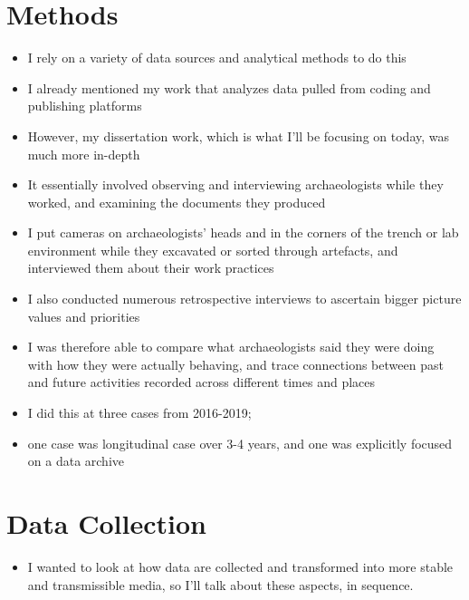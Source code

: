 \documentclass{article}
\begin{document}
\section{Methods}
\begin{itemize}
  \item I rely on a variety of data sources and analytical methods to do this
  \item I already mentioned my work that analyzes data pulled from coding and publishing platforms
  \item However, my dissertation work, which is what I'll be focusing on today, was much more in-depth
  \item It essentially involved observing and interviewing archaeologists while they worked, and examining the documents they produced
  \item I put cameras on archaeologists’ heads and in the corners of the trench or lab environment while they excavated or sorted through artefacts, and interviewed them about their work practices
  \item I also conducted numerous retrospective interviews to ascertain bigger picture values and priorities
  \item I was therefore able to compare what archaeologists said they were doing with how they were actually behaving, and trace connections between past and future activities recorded across different times and places
  \item I did this at three cases from 2016-2019;
  \item one case was longitudinal case over 3-4 years, and one was explicitly focused on a data archive
\end{itemize}

\section{Data Collection}
\begin{itemize}
  \item I wanted to look at how data are collected and transformed into more stable and transmissible media, so I'll talk about these aspects, in sequence.
\end{itemize}
\end{document}
